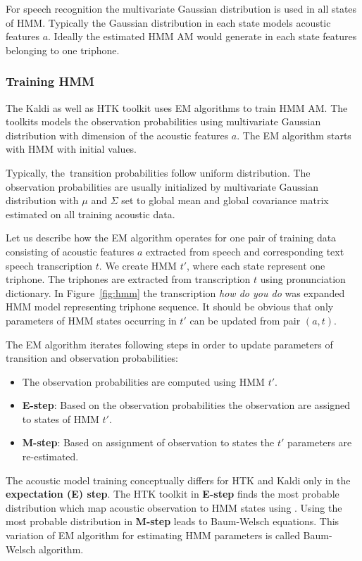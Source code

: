 {
For speech recognition the multivariate Gaussian distribution is used in all states of \ac{HMM}. 
Typically the Gaussian distribution in each state models acoustic features $a$.
Ideally the estimated \ac{HMM} \ac{AM} would generate in each state features belonging to one triphone.

\subsubsection*{Training \ac{HMM}}
\label{sub:trainhmm}

The Kaldi as well as \ac{HTK} toolkit uses \acl{EM} algorithms to train \ac{HMM} \acl{AM}.
The toolkits models the observation probabilities using multivariate Gaussian distribution 
with dimension of the acoustic features $a$.
The \ac{EM} algorithm starts with \ac{HMM} with initial values. 

Typically, the~transition probabilities follow uniform distribution.
The observation probabilities are usually initialized by multivariate Gaussian distribution
with $\mu$ and $\Sigma$ set to global mean and global covariance matrix 
estimated on all training acoustic data.

Let us describe how the \ac{EM} algorithm operates for one pair
of training data consisting of acoustic features $a$ extracted from speech
and corresponding text speech transcription $t$.
We create \ac{HMM} $t'$, where each state represent one triphone. The triphones are extracted from transcription $t$ using pronunciation dictionary.
In Figure~\ref{fig:hmm} the transcription {\it how do you do} was expanded \ac{HMM} model representing triphone sequence.
It should be obvious that only parameters of HMM states occurring in $t'$ can be updated from pair $(a, t)$.

The \ac{EM} algorithm iterates following steps in order to update parameters of transition and observation probabilities:
\begin{itemize}
    \item The observation probabilities are computed using \ac{HMM} $t'$. 
    \item {\bf E-step}: Based on the observation probabilities the observation are assigned to states of \ac{HMM} $t'$. 
    \item {\bf M-step}: Based on assignment of observation to states the $t'$ parameters are re-estimated. 
\end{itemize}

The acoustic model training conceptually differs for \ac{HTK} and Kaldi only in the {\bf expectation (E) step}.
The \ac{HTK} toolkit in {\bf E-step} finds the most probable distribution which map acoustic observation to \ac{HMM} states using . 
Using the most probable distribution in {\bf M-step} leads to Baum-Welsch equations. \cite{huang2001spoken}
This variation of \ac{EM} algorithm for estimating \ac{HMM} parameters is called Baum-Welsch algorithm.

}
